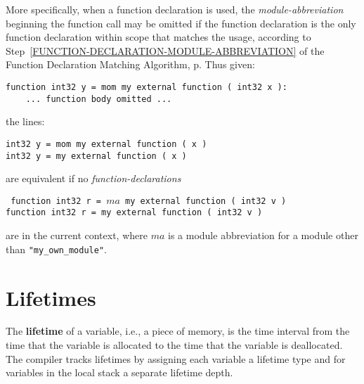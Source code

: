 \documentclass[12pt]{article}
\newcommand{\key}[1]{{\rm \bfseries #1}}
\newcommand{\pagref}[1]{p\pageref{#1}}
\newenvironment{indpar}[1][0.3in]%
	{\begin{list}{}%
		     {\setlength{\itemsep}{0in}%
		      \setlength{\topsep}{0in}%
		      \setlength{\parsep}{1ex}%
		      \setlength{\labelwidth}{#1}%
		      \setlength{\leftmargin}{#1}%
		      \addtolength{\leftmargin}{\labelsep}}%
	 \item}%
	{\end{list}}
\begin{document}
More specifically,
when a function declaration is used, the {\em module-abbreviation}
beginning the function call may be omitted if the function declaration is
the only function declaration within scope that matches the usage,
according to Step~\ref{FUNCTION-DECLARATION-MODULE-ABBREVIATION}
of the Function Declaration Matching Algorithm,
\pagref{FUNCTION-DECLARATION-MODULE-ABBREVIATION}.
Thus given:
\begin{indpar}\begin{verbatim}
function int32 y = mom my external function ( int32 x ):
    ... function body omitted ...
\end{verbatim}\end{indpar}
the lines:
\begin{indpar}\begin{verbatim}
int32 y = mom my external function ( x )
int32 y = my external function ( x )
\end{verbatim}\end{indpar}
are equivalent if no {\em function-declarations}
\begin{indpar}\tt
function int32 r = $ma$ my external function ( int32 v ) \\
function int32 r = my external function ( int32 v )
\end{indpar}
are in the current context, where $ma$ is a module abbreviation for a module
other than {\tt "my\_own\_module"}.

\section{Lifetimes}
\label{LIFETIMES}

The \key{lifetime} of a variable, i.e., a piece of memory,
is the time interval from the time that the variable
is allocated to the time that
the variable is deallocated.  The compiler tracks lifetimes by assigning each
variable a lifetime type and for variables in the local stack
a separate lifetime depth.
\end{document}
